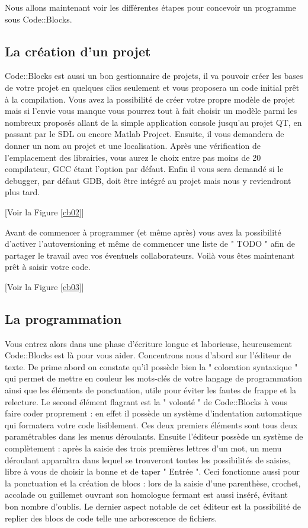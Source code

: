 \documentclass[a4paper, 12pt]{article}
\begin{document}
\begin{onehalfspacing}

Nous allons maintenant voir les différentes étapes pour concevoir un programme sous Code::Blocks.

\newpage \subsection{La création d'un projet}
Code::Blocks est aussi un bon gestionnaire de projets, il va pouvoir créer les bases de votre projet en quelques clics seulement et vous proposera un code initial prêt à la compilation. Vous avez la possibilité de créer votre propre modèle de projet mais si l'envie vous manque vous pourrez tout à fait choisir un modèle parmi les nombreux proposés allant de la simple application console jusqu'au projet QT, en passant par le SDL ou encore Matlab Project. Ensuite, il vous demandera de donner un nom au projet et une localisation. Après une vérification de l'emplacement des librairies, vous aurez le choix entre pas moins de 20 compilateur, GCC étant l'option par défaut. Enfin il vous sera demandé si le debugger, par défaut GDB, doit être intégré au projet mais nous y reviendront plus tard. 

[Voir la Figure \ref{cb02}]

Avant de commencer à programmer (et même après) vous avez la possibilité d'activer l'autoversioning et même de commencer une liste de " TODO " afin de partager le travail avec vos éventuels collaborateurs. Voilà vous êtes maintenant prêt à saisir votre code.

[Voir la Figure \ref{cb03}]



\newpage \subsection{La programmation}
Vous entrez alors dans une phase d'écriture longue et laborieuse, heureusement Code::Blocks est là pour vous aider. Concentrons nous d'abord sur l'éditeur de texte. De prime abord on constate qu'il possède bien la " coloration syntaxique " qui permet de mettre en couleur les mots-clés de votre langage de programmation ainsi que les éléments de ponctuation, utile pour éviter les fautes de frappe et la relecture. Le second élément flagrant est la " volonté " de Code::Blocks à vous faire coder proprement : en effet il possède un système d'indentation automatique qui formatera votre code lisiblement. Ces deux premiers éléments sont tous deux paramétrables dans les menus déroulants. Ensuite l'éditeur possède un système de complètement : après la saisie des trois premières lettres d'un mot, un menu déroulant apparaîtra dans lequel se trouveront toutes les possibilités de saisies, libre à vous de choisir la bonne et de taper " Entrée ". Ceci fonctionne aussi pour la ponctuation et la création de blocs : lors de la saisie d'une parenthèse, crochet, accolade ou guillemet ouvrant son homologue fermant est aussi inséré, évitant bon nombre d'oublis. Le dernier aspect notable de cet éditeur est la possibilité de replier des blocs de code telle une arborescence de fichiers.


\end{onehalfspacing}
\end{document}

